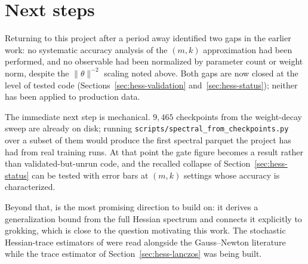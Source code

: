 \documentclass[11pt,a4paper]{article}
\begin{document}
\section{Next steps}
\label{sec:hess-next}

Returning to this project after a period away identified two gaps in the earlier
work: no systematic accuracy analysis of the $(m,k)$ approximation had been
performed, and no observable had been normalized by parameter count or weight
norm, despite the $\|\theta\|^{-2}$ scaling noted above. Both gaps are now
closed at the level of tested code (Sections~\ref{sec:hess-validation}
and~\ref{sec:hess-status}); neither has been applied to production data.

The immediate next step is mechanical. $9{,}465$ checkpoints from the
weight-decay sweep are already on disk; running
\texttt{scripts/spectral\_from\_checkpoints.py} over a subset of them would
produce the first spectral parquet the project has had from real training runs.
At that point the gate figure becomes a result rather than validated-but-unrun
code, and the recalled collapse of Section~\ref{sec:hess-status} can be tested
with error bars at $(m,k)$ settings whose accuracy is characterized.

Beyond that, \citet{tuci2026generalization} is the most promising direction to
build on: it derives a generalization bound from the full Hessian spectrum and
connects it explicitly to grokking, which is close to the question motivating
this work. The stochastic Hessian-trace estimators of
\citet{liu2023regularizing} were read alongside the Gauss--Newton literature
while the trace estimator of Section~\ref{sec:hess-lanczos} was being built.
\end{document}
